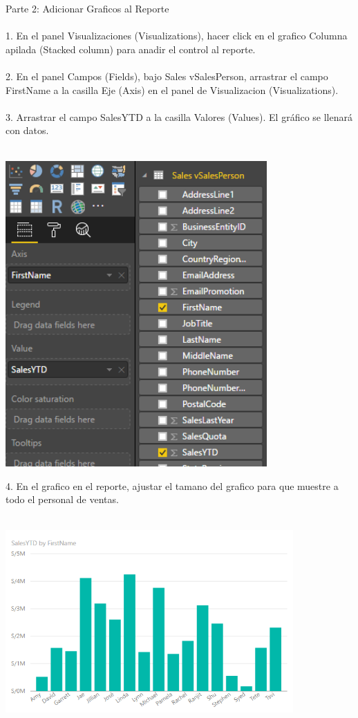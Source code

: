 \documentclass[12pt,letterpaper]{article}
\begin{document}
Parte 2: Adicionar Graficos al Reporte\\\\
1. En el panel Visualizaciones (Visualizations), hacer click en el grafico Columna apilada (Stacked column) para
anadir el control al reporte.\\\\
2. En el panel Campos (Fields), bajo Sales vSalesPerson, arrastrar el campo FirstName a la casilla Eje (Axis) en el
panel de Visualizacion (Visualizations).\\\\
3. Arrastrar el campo SalesYTD a la casilla Valores (Values). El gráfico se llenará con datos.\\\\
\begin{center}
\includegraphics[width=10cm]{IMG/21.png} 
\end{center}
4. En el grafico en el reporte, ajustar el tamano del grafico para que muestre a todo el personal de ventas.\\\\
\begin{center}
\includegraphics[width=11cm]{IMG/22.png} 
\end{center}
\end{document}
